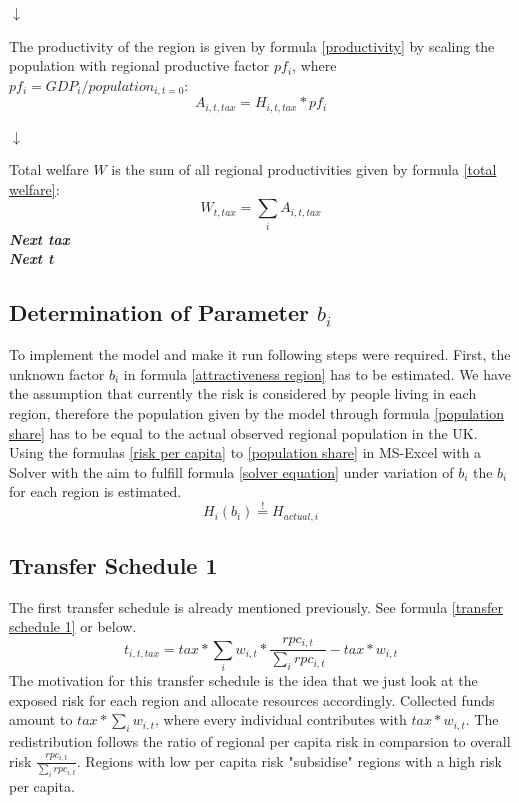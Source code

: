 \documentclass[10pt,a4paper]{article}
\begin{document}
\begin{center}
\begin{center}
    $\downarrow$
\end{center}
The productivity of the region is given by formula \ref{productivity} by scaling the population with regional productive factor $pf_i$, where $pf_i = GDP_i / population_{i,t=0}$:
\begin{equation}
    A_{i,t,tax} = H_{i,t,tax} * pf_i
    \label{productivity}
\end{equation}

\begin{center}
    $\downarrow$
\end{center}
Total welfare $W$ is the sum of all regional productivities given by formula \ref{total welfare}:
\begin{equation}
    W_{t,tax} = \sum_i A_{i,t,tax}
    \label{total welfare}
\end{equation}
\vspace{.25cm}
\newline
\textbf{\textit{Next tax}}
\\
\textbf{\textit{Next t}}
\end{center}

\subsection{Determination of Parameter $b_i$}
To implement the model and make it run following steps were required.
First, the unknown factor $b_i$ in formula \ref{attractiveness region} has to be estimated. We have the assumption that currently the risk is considered by people living in each region, therefore the population given by the model through formula \ref{population share} has to be equal to the actual observed regional population in the UK. Using the formulas \ref{risk per capita} to \ref{population share} in MS-Excel with a Solver with the aim to fulfill formula \ref{solver equation} under variation of $b_i$ the $b_i$ for each region is estimated.
\begin{equation}
    H_i(b_i) \stackrel{!}{=}  H_{actual,i}
    \label{solver equation}
\end{equation}

\subsection{Transfer Schedule 1}
The first transfer schedule is already mentioned previously. See formula \ref{transfer schedule 1} or below.
\begin{equation}
    t_{i,t,tax} = tax * \sum_i w_{i,t} * \frac{rpc_{i,t}}{\sum_i rpc_{i,t}} - tax * w_{i,t}
    \label{transfer schedule 1 again}
\end{equation}
The motivation for this transfer schedule is the idea that we just look at the exposed risk for each region and allocate resources accordingly. Collected funds amount to $tax * \sum_i w_{i,t}$, where every individual contributes with $tax * w_{i,t}$. The redistribution follows the ratio of regional per capita risk in comparsion to overall risk $\frac{rpc_{i,t}}{\sum_i rpc_{i,t}}$. Regions with low per capita risk "subsidise" regions with a high risk per capita.
\end{document}
